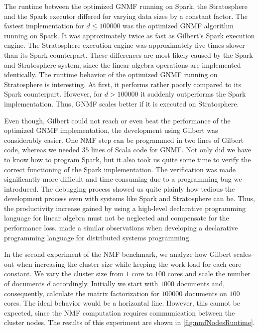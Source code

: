 The runtime between the optimized GNMF running on Spark, the Stratosphere and the Spark executor differed for varying data sizes by a constant factor.
The fastest implementation for $d\le 100000$ was the optimized GNMF algorithm running on Spark.
It was approximately twice as fast as Gilbert's Spark execution engine.
The Stratosphere execution engine was approximately five times slower than its Spark counterpart.
These differences are most likely caused by the Spark and Stratosphere system, since the linear algebra operations are implemented identically.
The runtime behavior of the optimized GNMF running on Stratosphere is interesting.
At first, it performs rather poorly compared to its Spark counterpart.
However, for $d>100000$ it suddenly outperforms the Spark implementation.
Thus, GNMF scales better if it is executed on Stratosphere. 

Even though, Gilbert could not reach or even beat the performance of the optimized GNMF implementation, the development using Gilbert was considerably easier.
One NMF step can be programmed in two lines of Gilbert code, whereas we needed $35$ lines of Scala code for GNMF.
Not only did we have to know how to program Spark, but it also took us quite some time to verify the correct functioning of the Spark implementation.
The verification was made significantly more difficult and time-consuming due to a programming bug we introduced.
The debugging process showed us quite plainly how tedious the development process even with systems like Spark and Stratosphere can be.
Thus, the productivity increase gained by using a high-level declarative programming language for linear algebra must not be neglected and compensate for the performance loss.
\Textcite{alvaro:2010a} made a similar observations when developing a declarative programming language for distributed systems programming.

In the second experiment of the NMF benchmark, we analyze how Gilbert scales-out when increasing the cluster size while keeping the work load for each core constant.
We vary the cluster size from $1$ core to $100$ cores and scale the number of documents $d$ accordingly.
Initially we start with $1000$ documents and, consequently, calculate the matrix factorization for $100000$ documents on $100$ cores.
The ideal behavior would be a horizontal line.
However, this cannot be expected, since the NMF computation requires communication between the cluster nodes.
The results of this experiment are shown in \cref{fig:nmfNodesRuntime}.

